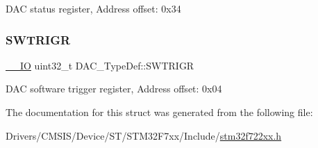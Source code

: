 D\+AC status register, Address offset\+: 0x34 \mbox{\label{struct_d_a_c___type_def_a4ccb66068a1ebee1179574dda20206b6}} 
\subsubsection{\texorpdfstring{SWTRIGR}{SWTRIGR}}
{\footnotesize\ttfamily \mbox{\hyperlink{core__sc300_8h_aec43007d9998a0a0e01faede4133d6be}{\+\_\+\+\_\+\+IO}} uint32\+\_\+t D\+A\+C\+\_\+\+Type\+Def\+::\+S\+W\+T\+R\+I\+GR}

D\+AC software trigger register, Address offset\+: 0x04 

The documentation for this struct was generated from the following file\+:\begin{DoxyCompactItemize}
\item 
Drivers/\+C\+M\+S\+I\+S/\+Device/\+S\+T/\+S\+T\+M32\+F7xx/\+Include/\mbox{\hyperlink{stm32f722xx_8h}{stm32f722xx.\+h}}\end{DoxyCompactItemize}
